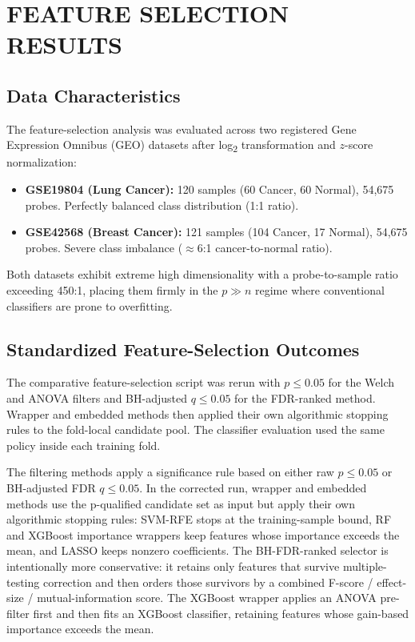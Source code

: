 \chapter{FEATURE SELECTION RESULTS}

\section{Data Characteristics}

The feature-selection analysis was evaluated across two registered Gene Expression Omnibus (GEO) datasets after log\textsubscript{2} transformation and $z$-score normalization:
\begin{itemize}
    \item \textbf{GSE19804 (Lung Cancer):} 120 samples (60 Cancer, 60 Normal), 54,675 probes. Perfectly balanced class distribution (1:1 ratio).
    \item \textbf{GSE42568 (Breast Cancer):} 121 samples (104 Cancer, 17 Normal), 54,675 probes. Severe class imbalance ($\approx$6:1 cancer-to-normal ratio).
\end{itemize}
Both datasets exhibit extreme high dimensionality with a probe-to-sample ratio exceeding 450:1, placing them firmly in the $p \gg n$ regime where conventional classifiers are prone to overfitting.

\section{Standardized Feature-Selection Outcomes}

The comparative feature-selection script was rerun with $p \leq 0.05$ for the Welch and ANOVA filters and BH-adjusted $q \leq 0.05$ for the FDR-ranked method. Wrapper and embedded methods then applied their own algorithmic stopping rules to the fold-local candidate pool. The classifier evaluation used the same policy inside each training fold.

The filtering methods apply a significance rule based on either raw $p \leq 0.05$ or BH-adjusted FDR $q \leq 0.05$. In the corrected run, wrapper and embedded methods use the p-qualified candidate set as input but apply their own algorithmic stopping rules: SVM-RFE stops at the training-sample bound, RF and XGBoost importance wrappers keep features whose importance exceeds the mean, and LASSO keeps nonzero coefficients. The BH-FDR-ranked selector is intentionally more conservative: it retains only features that survive multiple-testing correction and then orders those survivors by a combined F-score / effect-size / mutual-information score. The XGBoost wrapper applies an ANOVA pre-filter first and then fits an XGBoost classifier, retaining features whose gain-based importance exceeds the mean.

